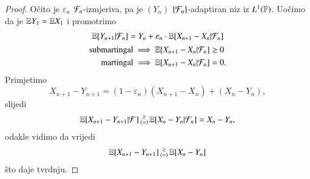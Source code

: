 \begin{proof}
    O\v cito je $\varepsilon_n$ $\mathcal{F}_n$-izmjeriva, pa je $(Y_n)$ $\{\mathcal{F}_n\}$-adaptiran niz iz $L^1(\mathbb{P})$.
    Uo\v cimo da je $\mathbb{E} Y_1 = \mathbb{E} X_1$ i promotrimo
    \begin{equation*}
        \begin{gathered}
            \mathbb{E} [Y_{n + 1} | \mathcal{F}_n] = Y_n + \varepsilon_n \cdot \mathbb{E} [X_{n + 1} - X_n | \mathcal{F}_n]\\
            \begin{aligned}
                \textnormal{submartingal} &\implies \mathbb{E} [X_{n + 1} - X_n | \mathcal{F}_n] \geq 0\\
                \textnormal{martingal} &\implies \mathbb{E} [X_{n + 1} - X_n | \mathcal{F}_n] = 0.
            \end{aligned}
        \end{gathered}
    \end{equation*}
    Primjetimo
    \begin{equation*}
        X_{n + 1} - Y_{n + 1} = (1 - \varepsilon_n) (X_{n + 1} - X_n) + (X_n - Y_n),
    \end{equation*}
    slijedi
    \begin{equation*}
        \mathbb{E} [X_{n + 1} - Y_{n + 1} | \mathcal{F}]
        \begin{smallmatrix}
            \geq\\
            (=)
        \end{smallmatrix}
        \mathbb{E} [X_n - Y_n | \mathcal{F}_n] = X_n - Y_n,
    \end{equation*}
    odakle vidimo da vrijedi
    \begin{equation*}
        \mathbb{E} [X_{n + 1} - Y_{n + 1}]
        \begin{smallmatrix}
            \geq\\
            (=)
        \end{smallmatrix}
        \mathbb{E} [X_n - Y_n]
    \end{equation*}
    \v sto daje tvrdnju.
\end{proof}

